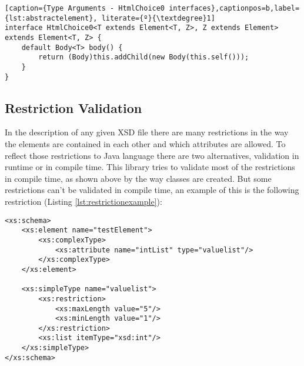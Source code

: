 \bigskip


\begin{minipage}{\linewidth}
\begin{lstlisting}[caption={Type Arguments - HtmlChoice0 interfaces},captionpos=b,label={lst:abstractelement}, literate={º}{\textdegree}1]
interface HtmlChoice0<T extends Element<T, Z>, Z extends Element> 		                                           extends Element<T, Z> {
    default Body<T> body() {
        return (Body)this.addChild(new Body(this.self()));
    }
}
\end{lstlisting}
\end{minipage}

\subsection{Restriction Validation}
\label{sec:restrictionvalidation}

In the description of any given \ac{XSD} file there are many restrictions in the way the elements are contained in each other and which attributes are allowed. To reflect those restrictions to Java language there are two alternatives, validation in runtime or in compile time. This library tries to validate most of the restrictions in compile time, as shown above by the way classes are created. But some restrictions can't be validated in compile time, an example of this is the following restriction (Listing \ref{lst:restrictionexample}):

\bigskip


\begin{minipage}{\linewidth}
\begin{lstlisting}[caption={Restrictions Example},captionpos=b,label={lst:restrictionexample}]
<xs:schema>
    <xs:element name="testElement">
        <xs:complexType>
            <xs:attribute name="intList" type="valuelist"/>
        </xs:complexType>
    </xs:element>
    
    <xs:simpleType name="valuelist">
        <xs:restriction>
            <xs:maxLength value="5"/>
            <xs:minLength value="1"/>
        </xs:restriction>
        <xs:list itemType="xsd:int"/>
    </xs:simpleType>
</xs:schema>
\end{lstlisting}
\end{minipage}

